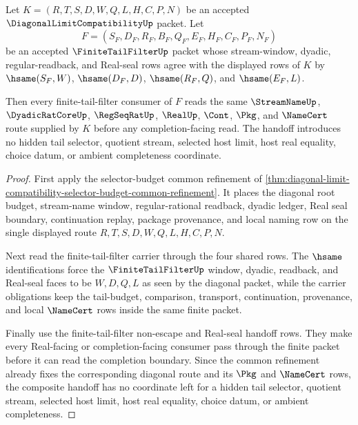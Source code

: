 \begin{theorem}
\label{thm:diagonal-limit-compatibility-finite-tail-filter-handoff}
Let $K=(R,T,S,D,W,Q,L,H,C,P,N)$ be an accepted $\DiagonalLimitCompatibilityUp$ packet. Let
$$
F=(S_F,D_F,R_F,B_F,Q_F,E_F,H_F,C_F,P_F,N_F)
$$
be an accepted $\FiniteTailFilterUp$ packet whose stream-window, dyadic, regular-readback, and Real-seal rows agree with the displayed rows of $K$ by $\hsame(S_F,W)$, $\hsame(D_F,D)$, $\hsame(R_F,Q)$, and $\hsame(E_F,L)$.

Then every finite-tail-filter consumer of $F$ reads the same $\StreamNameUp$, $\DyadicRatCoreUp$, $\RegSeqRatUp$, $\RealUp$, $\Cont$, $\Pkg$, and $\NameCert$ route supplied by $K$ before any completion-facing read. The handoff introduces no hidden tail selector, quotient stream, selected host limit, host real equality, choice datum, or ambient completeness coordinate.
\end{theorem}
\begin{proof}
First apply the selector-budget common refinement of \autoref{thm:diagonal-limit-compatibility-selector-budget-common-refinement}. It places the diagonal root budget, stream-name window, regular-rational readback, dyadic ledger, Real seal boundary, continuation replay, package provenance, and local naming row on the single displayed route $R,T,S,D,W,Q,L,H,C,P,N$.

Next read the finite-tail-filter carrier through the four shared rows. The $\hsame$ identifications force the $\FiniteTailFilterUp$ window, dyadic, readback, and Real-seal faces to be $W,D,Q,L$ as seen by the diagonal packet, while the carrier obligations keep the tail-budget, comparison, transport, continuation, provenance, and local $\NameCert$ rows inside the same finite packet.

Finally use the finite-tail-filter non-escape and Real-seal handoff rows. They make every Real-facing or completion-facing consumer pass through the finite packet before it can read the completion boundary. Since the common refinement already fixes the corresponding diagonal route and its $\Pkg$ and $\NameCert$ rows, the composite handoff has no coordinate left for a hidden tail selector, quotient stream, selected host limit, host real equality, choice datum, or ambient completeness.
\end{proof}

